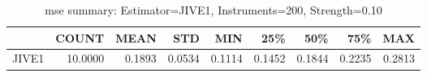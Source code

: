 \begin{table}[ht]
\centering
\caption{mse summary: Estimator=JIVE1, Instruments=200, Strength=0.10}
\begin{tabular}{lrrrrrrrr}
\toprule
 & COUNT & MEAN & STD & MIN & 25\% & 50\% & 75\% & MAX \\
\midrule
JIVE1 & 10.0000 & 0.1893 & 0.0534 & 0.1114 & 0.1452 & 0.1844 & 0.2235 & 0.2813 \\
\bottomrule
\end{tabular}
\end{table}
